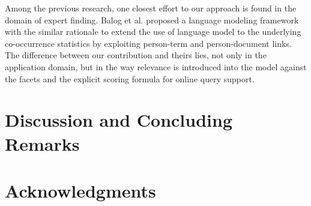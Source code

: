 
Among the previous research, one closest effort to our approach is found in the
domain of expert finding.  Balog et al. \cite{balog2009language} proposed a
language modeling framework with the similar rationale to extend the use of
language model to the underlying co-occurrence statistics by exploiting
person-term and person-document links.  The difference between our contribution
and theirs lies, not only in the application domain, but in the way relevance
is introduced into the model against the facets and the explicit scoring
formula for online query support.
 
\section{Discussion and Concluding Remarks}


% 
% 
% 

\section{Acknowledgments}


